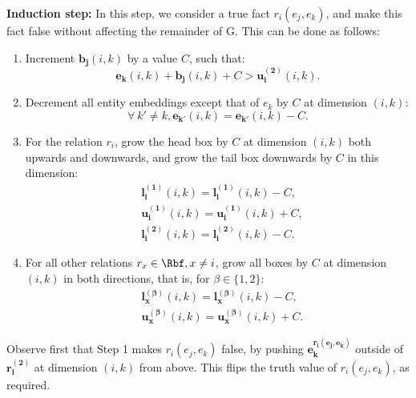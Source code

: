 \documentclass{article}
\begin{document}
\textbf{Induction step: } In this step, we consider a true fact $r_i(e_j, e_k)$, and make this fact false without affecting the remainder of G. This can be done as follows:
\begin{enumerate}[Step 1.]
    \item Increment $\bm{b_j}(i,k)$ by a value $C$, such that: 
    \[ 
    \bm{e_k}(i,k) + \bm{b_j}(i,k) + C > \bm{u_{i}^{(2)}}(i,k).
    \] 
    \item Decrement all entity embeddings except that of $e_k$ by $C$ at dimension $(i,k)$:
    \[\forall ~k' \neq k, \bm{e_{k'}}(i,k) = \bm{e_{k'}}(i,k) - C.\] 
    \item For the relation $r_i$, grow the head box by $C$ at dimension $(i,k)$ both upwards and downwards, and grow the tail box downwards by $C$ in this dimension: 
    \begin{align*}
         &\bm{l_{i}^{(1)}}(i,k) =\bm{l_{i}^{(1)}}(i,k) - C, \\ &\bm{u_{i}^{(1)}}(i,k) =\bm{u_{i}^{(1)}}(i,k) + C, \\ &\bm{l_{i}^{(2)}}(i,k) =\bm{l_{i}^{(2)}}(i,k) - C.
    \end{align*}
    \item For all other relations $r_x \in \Rbf, x \neq i$, grow all boxes by $C$ at dimension $(i,k)$ in both directions, that is, for $ \beta \in \{1,2\}$: 
    \begin{align*}
           &\bm{l_{x}^{(\beta)}}(i,k) =\bm{l_{x}^{(\beta)}}(i,k) - C,\\ &\bm{u_{x}^{(\beta)}}(i,k) =\bm{u_{x}^{(\beta)}}(i,k) + C.
    \end{align*}
\end{enumerate}

Observe first that Step 1 makes $r_i(e_j, e_k)$ false, by pushing $\bm{e_k^{r_i(e_j, e_k)}}$ outside of $\bm{r_{i}^{(2)}}$ at dimension $(i,k)$ from above. This flips the truth value of $r_i(e_j, e_k)$, as required.
\end{document}
